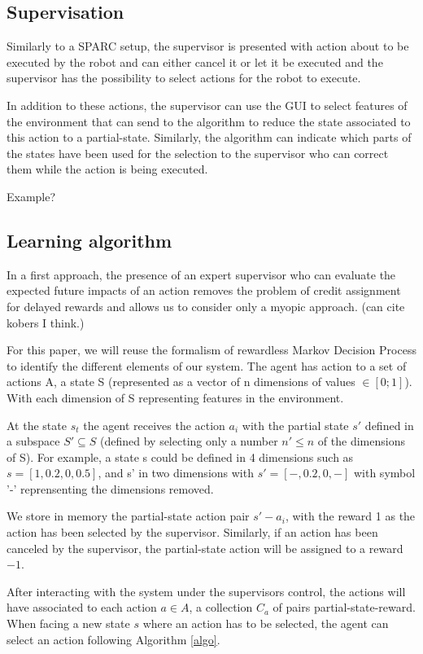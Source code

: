 \documentclass[letterpaper]{article} %
\begin{document}
\subsection{Supervisation}
Similarly to a SPARC setup, the supervisor is presented with action about to be
executed by the robot and can either cancel it or let it be executed and the 
supervisor has the possibility to select actions for the robot to execute.

In addition to these actions, the supervisor can use the GUI to select features
of the environment that can send to the algorithm to reduce the state associated
to this action to a partial-state. Similarly, the algorithm can indicate which
parts of the states have been used for the selection to the supervisor who can
correct them while the action is being executed.

Example?

\subsection{Learning algorithm}

In a first approach, the presence of an expert supervisor who can evaluate the
expected future impacts of an action removes the problem of credit assignment
for delayed rewards and allows us to consider only a myopic approach. (can cite
kobers I think.)

For this paper, we will reuse the formalism of rewardless Markov Decision 
Process to identify the different elements of our system. The agent has action
to a set of actions A, a state S (represented as a vector of n dimensions of
values $\in [0;1]$). With each dimension of S representing features in the
environment.

At the state $s_{t}$ the agent receives the action $a_{i}$ with the partial
state $s'$ defined in a subspace $S' \subseteq S$ (defined by selecting only a
number $n' \leq n$ of the dimensions of S). For example, a state s could be
defined in 4 dimensions such as $s=[1,0.2,0,0.5]$, and s' in two dimensions with
$s'=[-,0.2,0,-]$ with symbol '-' reprensenting the dimensions removed.

We store in memory the partial-state action pair $s'-a_{i}$, with the reward 1
as the action has been selected by the supervisor. Similarly, if an action has
been canceled by the supervisor, the partial-state action will be assigned to a
reward $-1$.

After interacting with the system under the supervisors control, the actions
will have associated to each action $a \in A$, a collection $C_{a}$ of pairs
partial-state-reward. When facing a new state $s$ where an action has to be
selected, the agent can select an action following Algorithm \ref{algo}.
\end{document}
